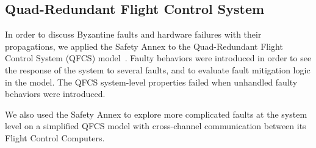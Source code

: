 


\subsection{Quad-Redundant Flight Control System}
In order to discuss Byzantine faults and hardware failures with their propagations, we applied the Safety Annex to the Quad-Redundant Flight Control System (QFCS) model~\cite{QFCS15:backes}. Faulty behaviors were introduced in order to see the response of the system to several faults, and to evaluate fault mitigation logic in the model. The QFCS system-level properties failed when unhandled faulty behaviors were introduced.

We also used the Safety Annex to explore more complicated faults at the system level on a simplified QFCS model with cross-channel communication between its Flight Control Computers.

